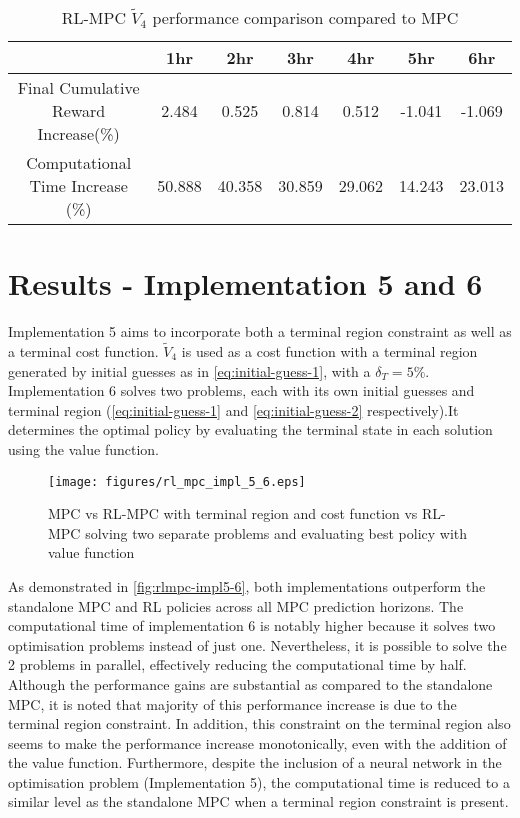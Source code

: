 \begin{table}[H]
	\centering
	\begin{tabular}{|c|cccccc|}
		\hline
		&1hr&2hr&3hr&4hr&5hr&6hr\\
		\hline
		Final Cumulative Reward Increase(\%) &2.484 &0.525&0.814&0.512&-1.041& -1.069\\
		\hline
		Computational Time Increase     (\%) &50.888 &40.358&30.859&29.062&14.243& 23.013\\
		\hline
	\end{tabular}
	\caption{RL-MPC $\tilde{V}_4$ performance comparison compared to MPC}
	\label{tab:rl-mpc-v4}
\end{table}



\section{Results - Implementation 5 and 6}
Implementation 5 aims to incorporate both a terminal region constraint as well as a terminal cost function. $\tilde{V}_4$ is used as a cost function with a terminal region generated by initial guesses as in \autoref{eq:initial-guess-1}, with a $\delta_T =5\%$. Implementation 6 solves two problems, each with its own initial guesses and terminal region (\autoref{eq:initial-guess-1} and \autoref{eq:initial-guess-2} respectively).It determines the optimal policy by evaluating the terminal state in each solution using the value function.
\begin{figure}[H]
	\centering
	\texttt{[image: figures/rl\_mpc\_impl\_5\_6.eps]}
	\caption{MPC vs RL-MPC with terminal region and cost function vs RL-MPC solving two separate problems and evaluating best policy with value function}
	\label{fig:rlmpc-impl5-6}
\end{figure}
As demonstrated in \autoref{fig:rlmpc-impl5-6}, both implementations outperform the standalone MPC and RL policies across all MPC prediction horizons. The computational time of implementation 6 is notably higher because it solves two optimisation problems instead of just one. Nevertheless, it is possible to solve the 2 problems in parallel, effectively reducing the computational time by half. Although the performance gains are substantial as compared to the standalone MPC, it is noted that majority of this performance increase is due to the terminal region constraint. In addition, this constraint on the terminal region also seems to make the performance increase monotonically, even with the addition of the value function. Furthermore, despite the inclusion of a neural network in the optimisation problem (Implementation 5), the computational time is reduced to a similar level as the standalone MPC when a terminal region constraint is present. 


